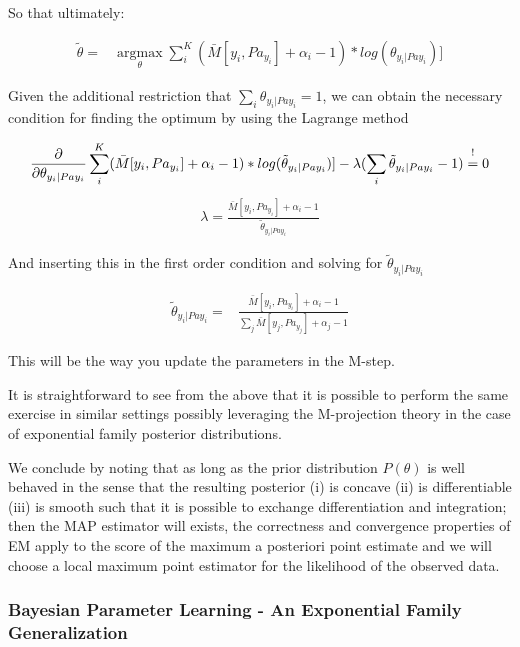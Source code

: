 \documentclass[11pt]{article}
\begin{document}
\begin{article}
So that ultimately:

\begin{align} \label{eq:solution2}
\tilde{\theta} =& \operatorname*{argmax}_{\theta} \sum_i^K (\bar{M}[y_i, Pa_{y_i}] + \alpha_i - 1) * log(\theta_{y_i | Pa{y_i}})] 
\end{align}

Given the additional restriction that \(\sum_i \theta_{y_i |
    Pa{y_i}} = 1\), we can obtain the necessary condition for finding
the optimum by using the Lagrange method

\begin{align} \label{eq:first-order1}
\frac{\partial}{\partial \theta_{y_i | Pa{y_i}}} \sum_i^K (\bar{M}[y_i, Pa_{y_i}] + \alpha_i - 1) * log(\tilde{\theta}_{y_i | Pa{y_i}})] - \lambda (\sum_i \tilde{\theta}_{y_i | Pa{y_i}} - 1) \mathrel{\stackon[5pt]{$=$}{$\scriptstyle!$}} 0
\end{align}
\begin{align} \label{eq:first-order2}
\lambda = \frac{\bar{M}[y_i, Pa_{y_i}] + \alpha_i - 1}{\tilde{\theta}_{y_i | Pa{y_i}}}
\end{align}

And inserting this in the first order condition and solving for
\(\tilde{\theta}_{y_i | Pa{y_i}}\)

\begin{align} \label{eq:solution}
\tilde{\theta}_{y_i | Pa{y_i}} =& \frac{\bar{M}[y_i, Pa_{y_i}] + \alpha_i - 1}{\sum_j \bar{M}[y_j, Pa_{y_j}] + \alpha_j - 1}
\end{align}

This will be the way you update the parameters in the M-step.

It is straightforward to see from the above that it is possible to
perform the same exercise in similar settings possibly leveraging
the M-projection theory in the case of exponential family posterior
distributions. 

We conclude by noting that as long as the prior distribution
\(P(\theta)\) is well behaved in the sense that the resulting
posterior (i) is concave (ii) is differentiable (iii) is smooth
such that it is possible to exchange differentiation and
integration; then the MAP estimator will exists, the correctness
and convergence properties of EM apply to the score of the maximum
a posteriori point estimate and we will choose a local maximum
point estimator for the likelihood of the observed data.

\subsubsection{Bayesian Parameter Learning - An Exponential Family Generalization}
\label{sec:org6b71227}


\end{article}
\end{document}
